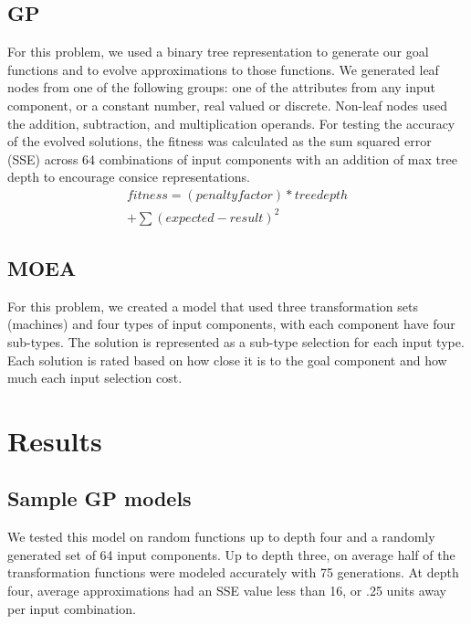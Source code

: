 \documentclass{IEEEtran}
\begin{document}
\subsection{GP}
For this problem, we used a binary tree representation to generate our goal functions and to evolve approximations to those functions. We generated leaf nodes from one of the following groups: one of the attributes from any input component, or a constant number, real valued or discrete. Non-leaf nodes used the addition, subtraction, and multiplication operands. For testing the accuracy of the evolved solutions, the fitness was calculated as the sum squared error (SSE) across 64 combinations of input components with an addition of max tree depth to encourage consice representations.
\begin{equation} \label{eq:1}
\begin{split}
fitness=(penaltyfactor)*treedepth \\
+ \sum (expected-result)^{2}
\end{split}
\end{equation}

\subsection{MOEA}
For this problem, we created a model that used three transformation sets (machines) and four types of input components, with each component have four sub-types. The solution is represented as a sub-type selection for each input type. Each solution is rated based on how close it is to the goal component and how much each input selection cost.

\section{Results}
\subsection{Sample GP models}
We tested this model on random functions up to depth four and a randomly generated set of 64 input components. Up to depth three, on average half of the transformation functions were modeled accurately with 75 generations. At depth four, average approximations had an SSE value less than 16, or .25 units away per input combination.
\end{document}
